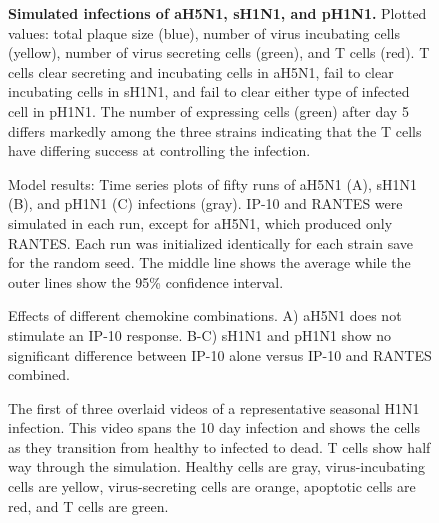 \documentclass[10pt]{article}
\begin{document}
\begin{figure}[!ht]
\begin{center}
 \end{center}
\caption{{\bf Simulated infections of aH5N1, sH1N1, and pH1N1.} Plotted values: total plaque size (blue), number of virus incubating cells (yellow), number of virus secreting cells (green), and T cells (red).  T cells clear secreting and incubating cells in aH5N1, fail to clear incubating cells in sH1N1, and fail to clear either type of infected cell in pH1N1.  The number of expressing cells (green) after day 5 differs markedly among the three strains indicating that the T cells have differing success at controlling the infection.} 
 \label{fig:plaquesize}
\end{figure}

\setcounter{figure}{0}
\renewcommand{\thefigure}{S\arabic{figure}}

\begin{figure}[ht!]
\begin{center}
 \end{center}
\caption{Model results: Time series plots of fifty runs of aH5N1 (A), sH1N1 (B), and pH1N1 (C) infections (gray). IP-10 and RANTES were simulated in each run, except for aH5N1, which  produced only RANTES.  Each run was initialized identically for each strain save for the random seed.  The middle line shows the average while the outer lines show the 95\% confidence interval.} 
 \label{fig:variance}
\end{figure}


\begin{figure}[ht!]
\begin{center}
	\caption{Effects of different chemokine combinations.  A) aH5N1 does not stimulate an IP-10 response.  B-C) sH1N1 and pH1N1 show no significant difference between IP-10 alone versus IP-10 and RANTES combined.}
	\label{fig:chemokine}
\end{center}
\end{figure}

\setcounter{figure}{0}
\renewcommand{\figurename}{Video}

\begin{figure}[ht!]
\caption{The first of three overlaid videos of a representative seasonal H1N1 infection.  This video spans the 10 day infection and shows the cells as they transition from healthy to infected to dead.  T cells show half way through the simulation.  Healthy cells are gray, virus-incubating cells are yellow, virus-secreting cells are orange, apoptotic cells are red, and T cells are green.} 
 \label{video:cell_view}
\end{figure}
\end{document}
